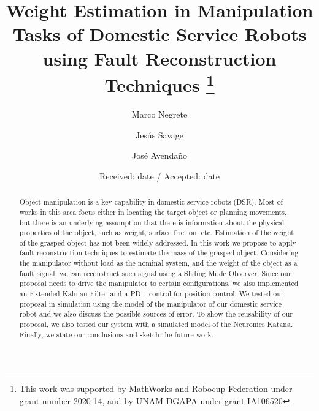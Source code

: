 \documentclass[smallextended]{svjour3}       %
\begin{document}
\title{Weight Estimation in Manipulation Tasks of Domestic Service Robots using Fault Reconstruction Techniques \thanks{This work was supported by MathWorks and Robocup Federation under grant number 2020-14, and by UNAM-DGAPA under grant IA106520}}
\author{Marco Negrete \and Jesús Savage \and José Avendaño}


\date{Received: date / Accepted: date}
\maketitle


\begin{abstract}
  Object manipulation is a key capability in domestic service robots (DSR). Most of works in this area focus either in locating the target object or planning movements, but there is an underlying assumption that there is information about the physical properties of the object, such as weight, surface friction, etc. Estimation of the weight of the grasped object has not been widely addressed. In this work we propose to apply fault reconstruction techniques to estimate the mass of the grasped object. Considering the manipulator without load as the nominal system, and the weight of the object as a fault signal, we can reconstruct such signal using a Sliding Mode Observer. Since our proposal needs to drive the manipulator to certain configurations, we also implemented an Extended Kalman Filter and a PD+ control for position control. We tested our proposal in simulation using the model of the manipulator of our domestic service robot and we also discuss the possible sources of error. To show the reusability of our proposal, we also tested our system with a simulated model of the Neuronics Katana. Finally, we state our conclusions and sketch the future work. 

\end{abstract}
\end{document}
